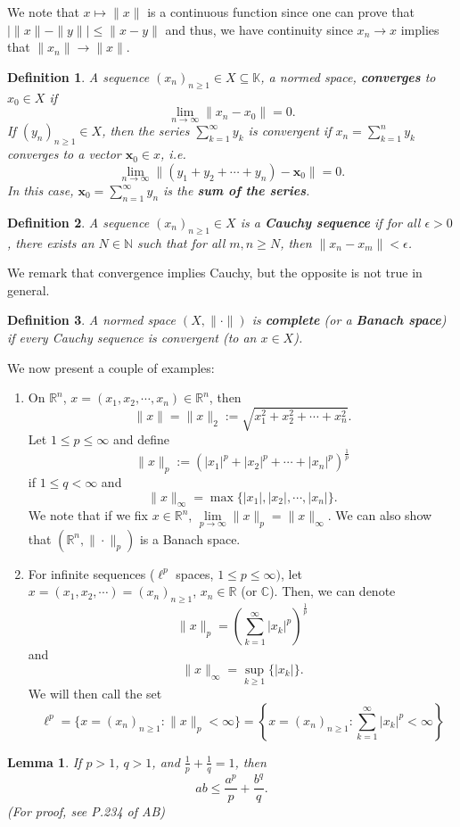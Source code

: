 \documentclass[12pt]{article}
\newtheorem{lemma}{Lemma}
\newtheorem{definition}{Definition}
\newcommand{\R}{{\mathbb R}}
\newcommand{\C}{{\mathbb C}}
\def\K{\mathbb{K}}
\newcommand{\N}{{\mathbb N}}
\newcommand{\suml}{\sum\limits}
\newcommand{\sumi}{\sum\limits_{n = 1}^{\infty}}
\newcommand{\sumk}{\sum\limits_{k = 1}^{\infty}}
\newcommand{\sse}{\subseteq}
\newcommand{\limi}{\lim\limits_{n \to \infty}}
\newcommand{\lp}{\left(}
\newcommand{\rp}{\right)}
\newcommand{\llb}{\left\lbrace}
\newcommand{\rrb}{\right\rbrace}
\newcommand{\vtf}{{\vspace{-25pt}}}
\newcommand{\mx}{\mathbf{x}}
\newcommand{\xs}{(x_n)_{n \geq 1} }
\begin{document}
We note that $x \mapsto \| x \|$ is a continuous function since one can prove that $\left| \| x \| - \| y \| \right| \leq \| x - y \|$ and thus, we have continuity since $x_n \to x$ implies that $\| x_n \| \to \| x \|$. 
\begin{definition}
A sequence $(x_n)_{n \geq 1} \in X \sse \K$, a normed space, \textbf{converges} to $x_0 \in X$ if 
\[ \limi \| x_n - x_0 \| = 0.\]
If $(y_n)_{n \geq 1}  \in X$, then the series $\sumk y_k$ is convergent if $x_n = \suml_{k = 1}^n y_k$ converges to a vector $\mx_0 \in x$, i.e.
\[ \limi \| (y_1 + y_2 + \cdots + y_n) - \mx_0 \| = 0.\]
In this case, $\mx_0 = \sumi y_n$ is the \textbf{sum of the series}.
\end{definition}
\begin{definition}
A sequence $\xs \in X$ is a \textbf{Cauchy sequence} if for all $\epsilon > 0$, there exists an $N \in \N$ such that for all $m, n \geq N$, then $\| x_n - x_m \| < \epsilon$. 
\end{definition}
\vtf 
We remark that convergence implies Cauchy, but the opposite is not true in general.
\begin{definition}
A normed space $(X, \| \cdot \|)$ is \textbf{complete} (or a \textbf{Banach space}) if every Cauchy sequence is convergent (to an $x \in X$). 
\end{definition}
\vtf
We now present a couple of examples:
\begin{enumerate}[topsep=-15pt]
\item On $\R^n$, $x = (x_1, x_2, \cdots, x_n) \in \R^n$, then 
\[ \| x \| = \| x \|_2 := \sqrt{x_1^2 + x_2^2 + \cdots + x_n^2}.\]
Let $1 \leq p \leq \infty$ and define 
\[ \| x \|_p := \left(|x_1|^p + |x_2|^p + \cdots + |x_n|^p  \rp^{\frac{1}{p}} \]
if $1 \leq q < \infty$ and 
\[ \| x \|_{\infty} = \max \{ |x_1| , |x_2|, \cdots, |x_n| \}.\]
We note that if we fix $x \in \R^n$, $\lim\limits_{p \to \infty} \| x \|_p = \| x \|_{\infty}$. We can also show that $\lp \R^n, \| \cdot \|_p \rp$ is a Banach space. 
\item For infinite sequences ($\ell^p$ spaces, $1 \leq p \leq \infty)$, let $x = (x_1, x_2, \cdots) = \xs$, $x_n \in \R$ (or $\C$). Then, we can denote 
\[ \| x \|_p = \lp \sumk |x_k|^p \rp^{\frac{1}{p}} \]
and 
\[ \|x \|_{\infty} = \sup\limits_{k \geq 1} \{ |x_k| \}.\]
We will then call the set 
\[ \ell^p = \{ x = \xs : \| x \|_p < \infty \} = \llb x = \xs : \sumk |x_k|^p < \infty \rrb \]
\end{enumerate}
\begin{lemma}
If $p > 1$, $q > 1$, and $\frac{1}{p} + \frac{1}{q} = 1$, then 
\[ ab \leq \frac{a^p}{p} + \frac{b^q}{q}.\] (For proof, see P.234 of AB)
\end{lemma}
\end{document}

